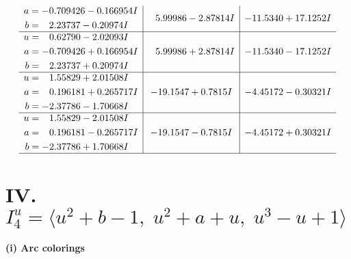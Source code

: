 \documentclass[1p]{elsarticle_modified}
\theoremstyle{definition}
\begin{document}
$$\begin{array}{c|c|c}
\begin{aligned}
a &= -0.709426 - 0.166954 I \\
b &= \phantom{-}2.23737 - 0.20974 I\end{aligned}
 & \phantom{-}5.99986 - 2.87814 I & -11.5340 + 17.1252 I \\ \hline\begin{aligned}
u &= \phantom{-}0.62790 - 2.02093 I \\
a &= -0.709426 + 0.166954 I \\
b &= \phantom{-}2.23737 + 0.20974 I\end{aligned}
 & \phantom{-}5.99986 + 2.87814 I & -11.5340 - 17.1252 I \\ \hline\begin{aligned}
u &= \phantom{-}1.55829 + 2.01508 I \\
a &= \phantom{-}0.196181 + 0.265717 I \\
b &= -2.37786 - 1.70668 I\end{aligned}
 & -19.1547 + 0.7815 I & -4.45172 - 0.30321 I \\ \hline\begin{aligned}
u &= \phantom{-}1.55829 - 2.01508 I \\
a &= \phantom{-}0.196181 - 0.265717 I \\
b &= -2.37786 + 1.70668 I\end{aligned}
 & -19.1547 - 0.7815 I & -4.45172 + 0.30321 I\\
 \hline 
 \end{array}$$\newpage\newpage\renewcommand{\arraystretch}{1}
\centering \section*{IV. $I^u_{4}= \langle u^2+b-1,\;u^2+a+u,\;u^3- u+1 \rangle$}
\flushleft \textbf{(i) Arc colorings}\\
\end{document}
